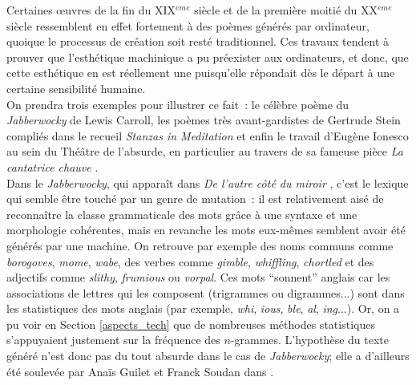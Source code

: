 \documentclass{article}
\begin{document}
				Certaines œuvres de la fin du XIX$^{eme}$ siècle et de la première moitié du XX$^{eme}$ siècle ressemblent en effet fortement à des poèmes générés par ordinateur, quoique le processus de création soit resté traditionnel. Ces travaux tendent à prouver que l'esthétique machinique a pu préexister aux ordinateurs, et donc, que cette esthétique en est réellement une puisqu'elle répondait dès le départ à une certaine sensibilité humaine.\\
				On prendra trois exemples pour illustrer ce fait~: le célèbre poème du \textit{Jabberwocky} de Lewis Carroll, les poèmes très avant-gardistes de Gertrude Stein compliés dans le recueil \textit{Stanzas in Meditation} \cite{stein1932} et enfin le travail d'Eugène Ionesco au sein du Théâtre de l'absurde, en particulier au travers de sa fameuse pièce \textit{La cantatrice chauve} \cite{ionesco1950}.\\
				
				Dans le \textit{Jabberwocky}, qui apparaît dans \textit{De l'autre côté du miroir} \cite{carroll1871}, c'est le lexique qui semble être touché par un genre de mutation~: il est relativement aisé de reconnaître la classe grammaticale des mots grâce à une syntaxe et une morphologie cohérentes, mais en revanche les mots eux-mêmes semblent avoir été générés par une machine. On retrouve par exemple des noms communs comme \textit{borogoves}, \textit{mome}, \textit{wabe}, des verbes comme \textit{gimble}, \textit{whiffling}, \textit{chortled} et des adjectifs comme \textit{slithy}, \textit{frumious} ou \textit{vorpal}. Ces mots ``sonnent'' anglais car les associations de lettres qui les composent (trigrammes ou digrammes...) sont dans les statistiques des mots anglais (par exemple, \textit{whi}, \textit{ious}, \textit{ble}, \textit{al}, \textit{ing}...). Or, on a pu voir en Section \ref{aspects_tech} que de nombreuses méthodes statistiques s'appuyaient justement sur la fréquence des $n$-grammes. L'hypothèse du texte généré n'est donc pas du tout absurde dans le cas de \textit{Jabberwocky}; elle a d'ailleurs été soulevée par Anaïs Guilet et Franck Soudan dans \cite{guilet2017}.\\
				
\end{document}
